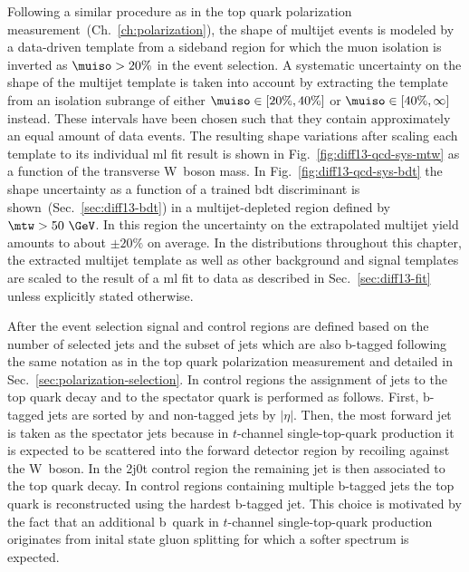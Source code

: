 Following a similar procedure as in the top quark polarization measurement~(Ch.~\ref{ch:polarization}), the shape of multijet events is modeled by a data-driven template from a sideband region for which the muon isolation is inverted as $\muiso>20\%$ in the event selection. A systematic uncertainty on the shape of the multijet template is taken into account by extracting the template from an isolation subrange of either $\muiso\in[20\%,40\%]$ or $\muiso\in[40\%,\infty]$ instead. These intervals have been chosen such that they contain approximately an equal amount of data events. The resulting shape variations after scaling each template to its individual \gls{ml} fit result is shown in Fig.~\ref{fig:diff13-qcd-sys-mtw} as a function of the transverse W~boson mass. In Fig.~\ref{fig:diff13-qcd-sys-bdt} the shape uncertainty as a function of a trained \gls{bdt} discriminant is shown~(Sec.~\ref{sec:diff13-bdt}) in a multijet-depleted region defined by $\mtw>50~\GeV$. In this region the uncertainty on the extrapolated multijet yield amounts to about $\pm20\%$ on average. In the distributions throughout this chapter, the extracted multijet template as well as other background and signal templates are scaled to the result of a \gls{ml} fit to data as described in Sec.~\ref{sec:diff13-fit} unless explicitly stated otherwise.



After the event selection signal and control regions are defined based on the number of selected jets and the subset of jets which are also b-tagged following the same notation as in the top quark polarization measurement and detailed in Sec.~\ref{sec:polarization-selection}. In control regions the assignment of jets to the top quark decay and to the spectator quark is performed as follows. First, b-tagged jets are sorted by \pt and non-tagged jets by $|\eta|$. Then, the most forward jet is taken as the spectator jets because in $t$-channel single-top-quark production it is expected to be scattered into the forward detector region by recoiling against the W~boson. In the 2j0t control region the remaining jet is then associated to the top quark decay. In control regions containing multiple b-tagged jets the top quark is reconstructed using the hardest b-tagged jet. This choice is motivated by the fact that an additional b~quark in $t$-channel single-top-quark production originates from inital state gluon splitting for which a softer spectrum is expected.

